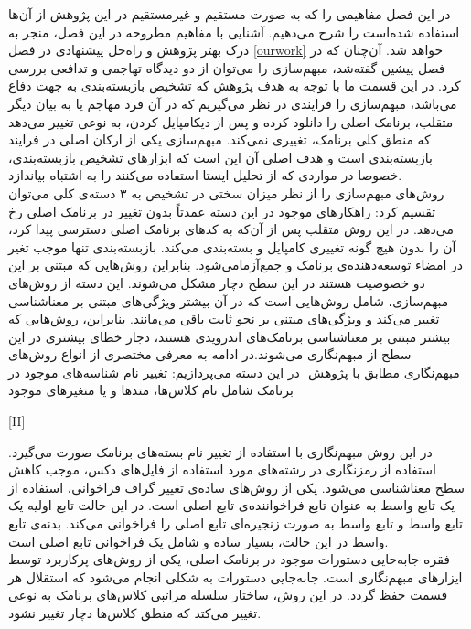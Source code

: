 
\label{premliminaries}
در این فصل مفاهیمی را که به صورت مستقیم و غیرمستقیم در این پژوهش از آن‌ها استفاده شده‌است را شرح ‌می‌دهیم. آشنایی با مفاهیم مطروحه در این فصل، منجر به درک بهتر پژوهش و راه‌حل پیشنهادی در فصل 
\ref{ourwork}
خواهد شد.
آن‌چنان که در فصل پیشین گفته‌شد، مبهم‌سازی را می‌توان از دو دیدگاه تهاجمی و تدافعی بررسی کرد. در این قسمت ما با توجه به هدف پژوهش که تشخیص بازبسته‌بندی به جهت دفاع می‌باشد، مبهم‌سازی را فرایندی در نظر می‌گیریم که در آن فرد مهاجم یا به بیان دیگر متقلب، برنامک اصلی را دانلود کرده و پس از دیکامپایل کردن، به نوعی تغییر می‌دهد که منطق کلی برنامک، تغییری نمی‌کند. مبهم‌سازی یکی از ارکان اصلی در فرایند بازبسته‌بندی ‌است و هدف اصلی آن این است که ابزار‌های تشخیص بازبسته‌بندی، خصوصا در مواردی که از تحلیل ایستا استفاده می‌کنند را به اشتباه بیاندازد.
\\
روش‌های مبهم‌سازی را از نظر میزان سختی در تشخیص به ۳ دسته‌ی کلی می‌توان تقسیم کرد: 
راهکار‌های موجود در این دسته عمدتاً بدون تغییر در برنامک اصلی رخ می‌دهد. در این روش متقلب پس از آن‌که به کد‌های برنامک اصلی دسترسی پیدا کرد، آن را بدون هیچ گونه تغییری کامپایل و بسته‌بندی می‌کند‌. بازبسته‌بندی تنها موجب تغیر در امضا‌ء توسعه‌دهنده‌ی برنامک  و جمع‌آزمامی‌شود. بنابراین روش‌هایی که مبتنی بر این دو خصوصیت هستند در این سطح دچار مشکل می‌شوند.
\label{miani}
این دسته از روش‌های مبهم‌سازی، شامل روش‌هایی است که در آن بیشتر ویژگی‌های مبتنی بر معناشناسی تغییر می‌کند و ویژگی‌های مبتنی بر نحو ثابت باقی می‌مانند. بنابراین، روش‌هایی که بیشتر مبتنی بر معنا‌شناسی برنامک‌های اندرویدی هستند، دجار خطای بیشتری در این سطح از مبهم‌نگاری می‌شوند.در ادامه به معرفی مختصری از انواع روش‌های مبهم‌نگاری مطابق با پژوهش  ‌ در این دسته می‌پردازیم:
  تغییر نام شناسه‌های موجود در برنامک شامل نام کلاس‌ها، متد‌ها و یا متغیر‌های موجود 


[H]
\vspace{1em}

  در این روش مبهم‌نگاری با استفاده از تغییر نام بسته‌های برنامک صورت می‌گیرد.
  استفاده از رمز‌نگاری در رشته‌های مورد استفاده از فایل‌های دکس، موجب کاهش سطح معناشناسی می‌شود. 
  یکی از روش‌های ساده‌ی تغییر گراف فراخوانی، استفاده از یک تابع واسط به عنوان تابع فراخواننده‌ی تابع اصلی است. در این حالت تابع اولیه یک تابع واسط و تابع واسط به صورت زنجیر‌ه‌ای تابع اصلی را فراخوانی می‌کند. بدنه‌ی تابع واسط در این حالت، بسیار ساده و شامل یک فراخوانی تابع اصلی‌ است.
\\فقره  جابه‌حایی دستورات موجود در برنامک اصلی، یکی از روش‌های پرکاربرد توسط ایزار‌های مبهم‌نگاری است. جابه‌جایی دستورات به شکلی انجام می‌شود که استقلال هر قسمت حفظ گردد.
  در این روش، ساختار سلسله مراتبی کلاس‌های برنامک به نوعی تغییر می‌کتد که منطق کلاس‌ها دچار تغییر نشود.


